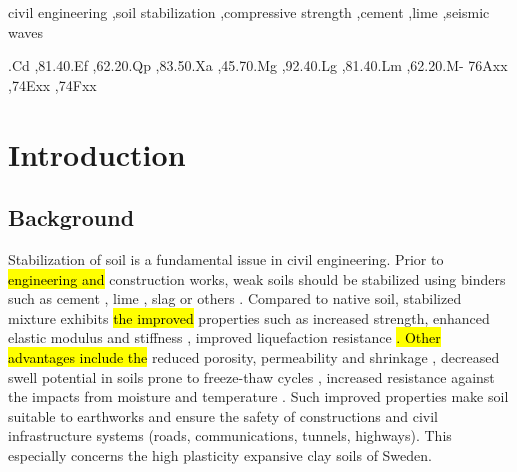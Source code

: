 \documentclass[final,3p,times,onecolumn,authoryear]{elsarticle}
\begin{document}
\begin{frontmatter}
\begin{keyword}

civil engineering \sep soil stabilization \sep compressive strength \sep cement \sep lime \sep seismic waves

.Cd \sep 81.40.Ef \sep 62.20.Qp \sep 83.50.Xa \sep 45.70.Mg \sep 92.40.Lg \sep 81.40.Lm \sep 62.20.M-
\MSC 76Axx \sep 74Exx \sep 74Fxx

\end{keyword}

\end{frontmatter}


\linenumbers
\section{Introduction}

\subsection{Background}

Stabilization of soil is a fundamental issue in civil engineering. Prior to \hl{engineering and }construction works, weak soils should be stabilized using binders such as cement \citep{Bache,Chenetal2021,LindhLemenkova2022b}, lime \citep{Kichouetal,Chand}, slag \citep{LindhLemenkova2021a} or others \citep{Mirzababaei}. Compared to native soil, stabilized mixture exhibits\hl{ the improved} properties such as increased strength, enhanced elastic modulus and stiffness \citep{Madhyannapuetal2010,SUNDARY2022103299}, improved liquefaction resistance \citep{ITO199433}\hl{. Other advantages include the }reduced porosity, permeability and shrinkage \citep{TONINIDEARAUJO2023129757,Nagih,Ahnberg2003}, decreased swell potential in soils prone to freeze-thaw cycles \citep{ShihataBaghdadi,BinShafique,Orakoglu}, increased resistance against the impacts from moisture and temperature \citep{Zhangetal2020,Kimetal2012}. Such improved properties make soil suitable to earthworks and ensure the safety of constructions and civil infrastructure systems (roads, communications, tunnels, highways). This especially concerns the high plasticity expansive clay soils of Sweden. 
\end{document}
